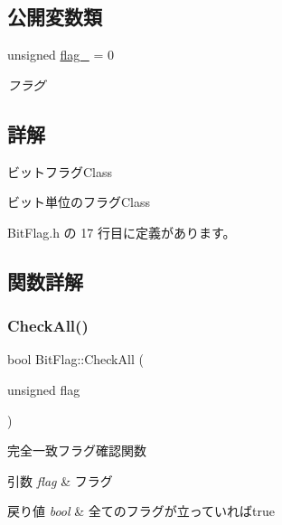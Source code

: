 \subsection*{公開変数類}
\begin{DoxyCompactItemize}
\item 
unsigned \mbox{\hyperlink{class_bit_flag_a028f7ae93ca40f24eefaef58aad615bc}{flag\+\_\+}} = 0
\begin{DoxyCompactList}\small\item\em フラグ \end{DoxyCompactList}\end{DoxyCompactItemize}


\subsection{詳解}
ビットフラグ\+Class 

ビット単位のフラグ\+Class 

 Bit\+Flag.\+h の 17 行目に定義があります。



\subsection{関数詳解}
\mbox{\label{class_bit_flag_abfb42d46682425d99275ac15c51a02f4}} 
\subsubsection{\texorpdfstring{Check\+All()}{CheckAll()}}
{\footnotesize\ttfamily bool Bit\+Flag\+::\+Check\+All (\begin{DoxyParamCaption}\item[{unsigned}]{flag }\end{DoxyParamCaption})}



完全一致フラグ確認関数 


\begin{DoxyParams}{引数}
{\em flag} & フラグ \\
\hline
\end{DoxyParams}

\begin{DoxyRetVals}{戻り値}
{\em bool} & 全てのフラグが立っていればtrue \\
\hline
\end{DoxyRetVals}


